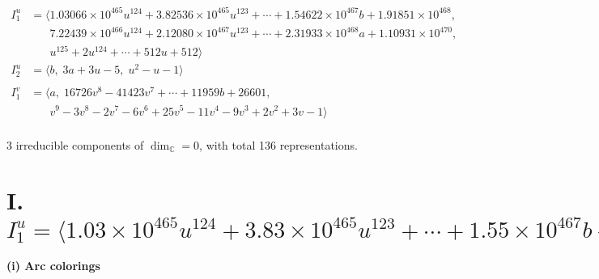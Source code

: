 \documentclass[1p]{elsarticle_modified}
\theoremstyle{definition}
\begin{document}
\begin{align*}
I^u_{1}&=\langle 
1.03066\times10^{465} u^{124}+3.82536\times10^{465} u^{123}+\cdots+1.54622\times10^{467} b+1.91851\times10^{468},\\
\phantom{I^u_{1}}&\phantom{= \langle  }7.22439\times10^{466} u^{124}+2.12080\times10^{467} u^{123}+\cdots+2.31933\times10^{468} a+1.10931\times10^{470},\\
\phantom{I^u_{1}}&\phantom{= \langle  }u^{125}+2 u^{124}+\cdots+512 u+512\rangle \\
I^u_{2}&=\langle 
b,\;3 a+3 u-5,\;u^2- u-1\rangle \\
\\
I^v_{1}&=\langle 
a,\;16726 v^8-41423 v^7+\cdots+11959 b+26601,\\
\phantom{I^v_{1}}&\phantom{= \langle  }v^9-3 v^8-2 v^7-6 v^6+25 v^5-11 v^4-9 v^3+2 v^2+3 v-1\rangle \\
\end{align*}
\raggedright * 3 irreducible components of $\dim_{\mathbb{C}}=0$, with total 136 representations.\\
\newpage
\renewcommand{\arraystretch}{1}
\centering \section*{I. $I^u_{1}= \langle 1.03\times10^{465} u^{124}+3.83\times10^{465} u^{123}+\cdots+1.55\times10^{467} b+1.92\times10^{468},\;7.22\times10^{466} u^{124}+2.12\times10^{467} u^{123}+\cdots+2.32\times10^{468} a+1.11\times10^{470},\;u^{125}+2 u^{124}+\cdots+512 u+512 \rangle$}
\flushleft \textbf{(i) Arc colorings}\\
\end{document}
